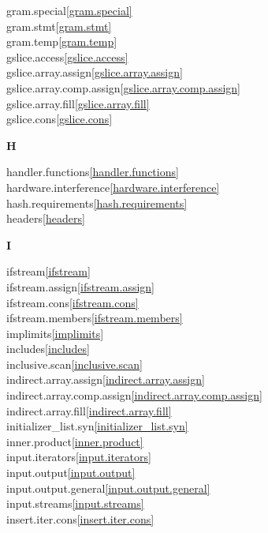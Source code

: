 \begin{multicols}{2}
gram.special\quad\ref{gram.special}\\
gram.stmt\quad\ref{gram.stmt}\\
gram.temp\quad\ref{gram.temp}\\
gslice.access\quad\ref{gslice.access}\\
gslice.array.assign\quad\ref{gslice.array.assign}\\
gslice.array.comp.assign\quad\ref{gslice.array.comp.assign}\\
gslice.array.fill\quad\ref{gslice.array.fill}\\
gslice.cons\quad\ref{gslice.cons}\\
\par \textbf{H}\par
handler.functions\quad\ref{handler.functions}\\
hardware.interference\quad\ref{hardware.interference}\\
hash.requirements\quad\ref{hash.requirements}\\
headers\quad\ref{headers}\\
\par \textbf{I}\par
ifstream\quad\ref{ifstream}\\
ifstream.assign\quad\ref{ifstream.assign}\\
ifstream.cons\quad\ref{ifstream.cons}\\
ifstream.members\quad\ref{ifstream.members}\\
implimits\quad\ref{implimits}\\
includes\quad\ref{includes}\\
inclusive.scan\quad\ref{inclusive.scan}\\
indirect.array.assign\quad\ref{indirect.array.assign}\\
indirect.array.comp.assign\quad\ref{indirect.array.comp.assign}\\
indirect.array.fill\quad\ref{indirect.array.fill}\\
initializer_list.syn\quad\ref{initializer_list.syn}\\
inner.product\quad\ref{inner.product}\\
input.iterators\quad\ref{input.iterators}\\
input.output\quad\ref{input.output}\\
input.output.general\quad\ref{input.output.general}\\
input.streams\quad\ref{input.streams}\\
insert.iter.cons\quad\ref{insert.iter.cons}\\

\end{multicols}
